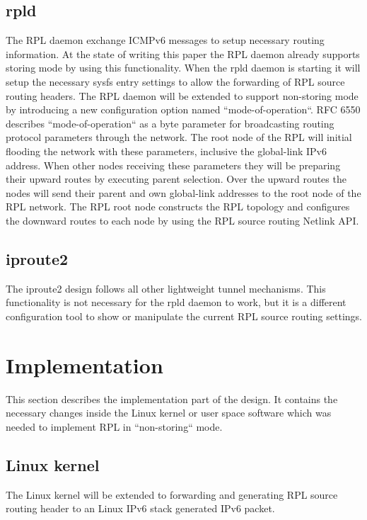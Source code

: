 \documentclass[letterpaper]{article}
\begin{document}
\subsection{rpld}

The RPL daemon exchange ICMPv6 messages to setup necessary routing information.
At the state of writing this paper the RPL daemon already supports storing mode
by using this functionality.
When the rpld daemon is starting it will setup the necessary sysfs entry settings to allow the forwarding of RPL source routing headers.
The RPL daemon will be extended to support non-storing mode by introducing a new configuration option named ``mode-of-operation``.
RFC 6550 describes ``mode-of-operation`` as a byte parameter for broadcasting routing protocol parameters through the network.
The root node of the RPL will initial flooding the network with these
parameters, inclusive the global-link IPv6 address.
When other nodes receiving these parameters they will be preparing their upward
routes by executing parent selection.
Over the upward routes the nodes will send their parent and own global-link
addresses to the root node of the RPL network.
The RPL root node constructs the RPL topology and configures the downward routes to each node by using the RPL source routing Netlink API.

\subsection{iproute2}

The iproute2 design follows all other lightweight tunnel mechanisms.
This functionality is not necessary for the rpld daemon to work, but it is a different configuration tool to show or manipulate the current RPL source routing settings.

\section{Implementation}

This section describes the implementation part of the design. It contains the necessary changes inside the Linux kernel or user space software which was needed to implement RPL in ``non-storing`` mode.

\subsection{Linux kernel}

The Linux kernel will be extended to forwarding and generating RPL source routing header to an Linux IPv6 stack generated IPv6 packet.
\end{document}
